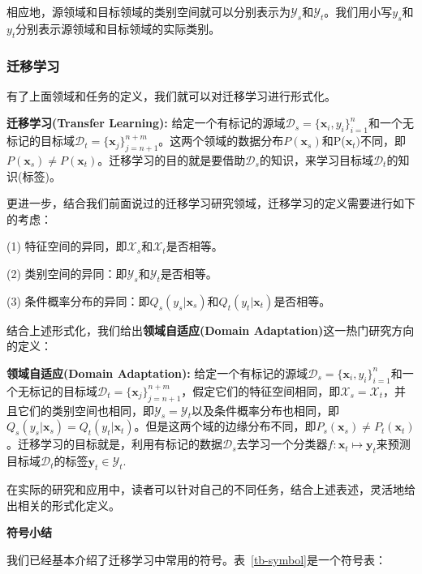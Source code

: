 相应地，源领域和目标领域的类别空间就可以分别表示为$\mathcal{Y}_s$和$\mathcal{Y}_t$。我们用小写$y_s$和$y_t$分别表示源领域和目标领域的实际类别。

\subsubsection{迁移学习}

有了上面领域和任务的定义，我们就可以对迁移学习进行形式化。

\textbf{迁移学习(Transfer Learning):} 给定一个有标记的源域$\mathcal{D}_s=\{\mathbf{x}_{i},y_{i}\}^n_{i=1}$和一个无标记的目标域$\mathcal{D}_t=\{\mathbf{x}_{j}\}^{n+m}_{j=n+1}$。这两个领域的数据分布$P(\mathbf{x}_s)$和P($\mathbf{x}_t)$不同，即$P(\mathbf{x}_s) \ne P(\mathbf{x}_t)$。迁移学习的目的就是要借助$\mathcal{D}_s$的知识，来学习目标域$\mathcal{D}_t$的知识(标签)。

更进一步，结合我们前面说过的迁移学习研究领域，迁移学习的定义需要进行如下的考虑：

(1) 特征空间的异同，即$\mathcal{X}_s$和$\mathcal{X}_t$是否相等。

(2) 类别空间的异同：即$\mathcal{Y}_s$和$\mathcal{Y}_t$是否相等。

(3) 条件概率分布的异同：即$Q_s(y_s|\mathbf{x}_s)$和$Q_t(y_t|\mathbf{x}_t)$是否相等。

结合上述形式化，我们给出\textbf{领域自适应(Domain Adaptation)}这一热门研究方向的定义：

\textbf{领域自适应(Domain Adaptation):} 给定一个有标记的源域$\mathcal{D}_s=\{\mathbf{x}_{i},y_{i}\}^n_{i=1}$和一个无标记的目标域$\mathcal{D}_t=\{\mathbf{x}_{j}\}^{n+m}_{j=n+1}$，假定它们的特征空间相同，即$\mathcal{X}_s = \mathcal{X}_t$，并且它们的类别空间也相同，即$\mathcal{Y}_s = \mathcal{Y}_t$以及条件概率分布也相同，即$Q_s(y_s|\mathbf{x}_s) = Q_t(y_t|\mathbf{x}_t)$。但是这两个域的边缘分布不同，即$P_s(\mathbf{x}_s) \ne P_t(\mathbf{x}_t)$。迁移学习的目标就是，利用有标记的数据$\mathcal{D}_s$去学习一个分类器$f:\mathbf{x}_t \mapsto \mathbf{y}_t$来预测目标域$\mathcal{D}_t$的标签$\mathbf{y}_t \in \mathcal{Y}_t$.

在实际的研究和应用中，读者可以针对自己的不同任务，结合上述表述，灵活地给出相关的形式化定义。

\textbf{符号小结}

我们已经基本介绍了迁移学习中常用的符号。表~\ref{tb-symbol}是一个符号表：

